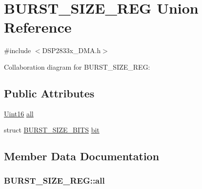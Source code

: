 \hypertarget{union_b_u_r_s_t___s_i_z_e___r_e_g}{}\section{B\+U\+R\+S\+T\+\_\+\+S\+I\+Z\+E\+\_\+\+R\+E\+G Union Reference}
\label{union_b_u_r_s_t___s_i_z_e___r_e_g}


{\ttfamily \#include $<$D\+S\+P2833x\+\_\+\+D\+M\+A.\+h$>$}



Collaboration diagram for B\+U\+R\+S\+T\+\_\+\+S\+I\+Z\+E\+\_\+\+R\+E\+G\+:
\subsection*{Public Attributes}
\begin{DoxyCompactItemize}
\item 
\hyperlink{_d_s_p2833x___device_8h_a59a9f6be4562c327cbfb4f7e8e18f08b}{Uint16} \hyperlink{union_b_u_r_s_t___s_i_z_e___r_e_g_a6b3f6ea893174c84c01b04a8d67b987d}{all}
\item 
struct \hyperlink{struct_b_u_r_s_t___s_i_z_e___b_i_t_s}{B\+U\+R\+S\+T\+\_\+\+S\+I\+Z\+E\+\_\+\+B\+I\+T\+S} \hyperlink{union_b_u_r_s_t___s_i_z_e___r_e_g_a1c5ea2df20b855abba5769efbdd3d0dc}{bit}
\end{DoxyCompactItemize}


\subsection{Member Data Documentation}
\hypertarget{union_b_u_r_s_t___s_i_z_e___r_e_g_a6b3f6ea893174c84c01b04a8d67b987d}{}
\subsubsection[{all}]{ B\+U\+R\+S\+T\+\_\+\+S\+I\+Z\+E\+\_\+\+R\+E\+G\+::all}\label{union_b_u_r_s_t___s_i_z_e___r_e_g_a6b3f6ea893174c84c01b04a8d67b987d}
\hypertarget{union_b_u_r_s_t___s_i_z_e___r_e_g_a1c5ea2df20b855abba5769efbdd3d0dc}{}

